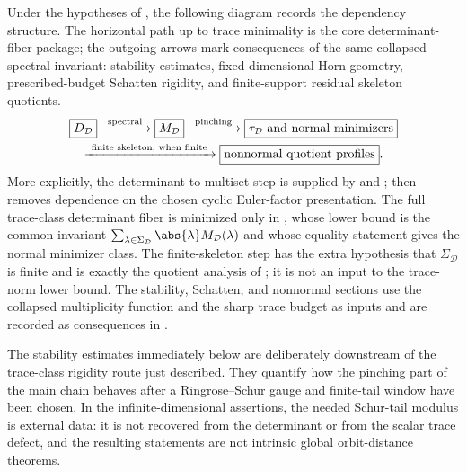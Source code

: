 Under the hypotheses of
, the following diagram records
the dependency structure.  The horizontal path up to trace minimality is the
core determinant-fiber package; the outgoing arrows mark consequences of the same
collapsed spectral invariant: stability estimates, fixed-dimensional Horn
geometry, prescribed-budget Schatten rigidity, and finite-support residual
skeleton quotients.
  \[
  \begin{gathered}
  \boxed{D_{\mathcal D}}
  \xrightarrow{\ \textup{spectral}\ }
  \boxed{M_{\mathcal D}}
  \xrightarrow{\ \textup{pinching}\ }
  \boxed{\tau_{\mathcal D}\textup{ and normal minimizers}}\\
  \xrightarrow{\ \textup{finite skeleton, when finite}\ }
  \boxed{\textup{nonnormal quotient profiles}} .
  \end{gathered}
  \]
More explicitly, the determinant-to-multiset step is supplied by
 and
;
 then removes dependence on the chosen
cyclic Euler-factor presentation.  The full trace-class determinant fiber is
minimized only in , whose lower
bound is the common invariant
\(\sum_{\lambda\in\Sigma_{\mathcal D}}
\abs{\lambda}M_{\mathcal D}(\lambda)\) and whose equality statement gives the
normal minimizer class.  The finite-skeleton step has the extra hypothesis
that \(\Sigma_{\mathcal D}\) is finite and is exactly the quotient analysis of
; it is not an input to the
trace-norm lower bound.  The stability, Schatten, and nonnormal sections use
the collapsed multiplicity function and the sharp trace budget as inputs and
are recorded as consequences in .

The stability estimates immediately below are deliberately downstream of
the trace-class rigidity route just described. They quantify how the pinching
part of the main chain behaves after a Ringrose--Schur gauge and finite-tail
window have been chosen.  In the infinite-dimensional assertions, the needed
Schur-tail modulus is external data: it is not recovered from the determinant or
from the scalar trace defect, and the resulting statements are not intrinsic
global orbit-distance theorems.

